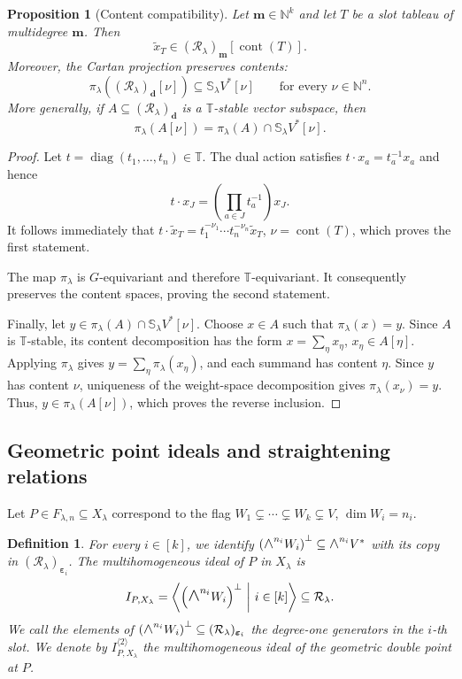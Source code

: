 \documentclass[a4paper,reqno]{amsart}
\theoremstyle{plainnopunct}
\newtheorem{proposition}[proposition]{Proposition}
\theoremstyle{definitionnopunct}
\newtheorem{definition}[definition]{Definition}
\newcommand{\superwedge}{\mathlarger{\mathlarger{\wedge}}}
\newcommand{\N}{\mathbb{N}}
\renewcommand{\S}{\mathbb{S}}
\newcommand{\cR}{\mathcal{R}}
\newcommand{\bd}{\mathbf{d}}
\newcommand{\bepsilon}{\boldsymbol{\varepsilon}}
\DeclareMathOperator{\cont}{cont}
\begin{document}
\begin{proposition}[Content compatibility]
\label{prop: slot content compatibility}
Let $\mathbf m\in\N^k
$ and let $T$ be a slot tableau of multidegree $\mathbf m$. Then
\[
\widetilde{x}_T
\in
(\cR_\lambda)_{\mathbf m}[\cont(T)].
\]
Moreover, the Cartan projection preserves contents:
\[
\pi_\lambda
\left(
(\cR_\lambda)_{\bd}[\nu]
\right)
\subseteq
\S_\lambda V^*[\nu]
\qquad
\text{for every }\nu\in\N^n.
\]
More generally, if $A\subseteq
(\cR_\lambda)_{\bd}$
is a $\mathbb T$-stable vector subspace, then
\[
\pi_\lambda
\left(
A[\nu]
\right)
=
\pi_\lambda(A)
\cap
\S_\lambda V^*[\nu].
\]
\end{proposition}

\begin{proof}
Let $t=\operatorname{diag}(t_1,\ldots,t_n)
\in\mathbb T$.
The dual action satisfies $t\cdot x_a=t_a^{-1}x_a$
and hence
\[
t\cdot x_J
=
\left(
\prod_{a\in J}t_a^{-1}
\right)x_J.
\]
It follows immediately that
$t\cdot\widetilde{x}_T
=
t_1^{-\nu_1}\cdots t_n^{-\nu_n}
\widetilde{x}_T$, $\nu=\cont(T)$,
which proves the first statement.

The map $\pi_\lambda$ is $G$-equivariant and therefore
$\mathbb T$-equivariant. It consequently preserves the content
spaces, proving the second statement.

Finally, let
$y
\in
\pi_\lambda(A)
\cap
\S_\lambda V^*[\nu]$.
Choose $x\in A$ such that
$\pi_\lambda(x)=y$.
Since $A$ is $\mathbb T$-stable, its content decomposition has the
form
$x=\sum_\eta x_\eta$,
$x_\eta\in A[\eta]$.
Applying $\pi_\lambda$ gives
$y
=
\sum_\eta
\pi_\lambda(x_\eta)$,
and each summand has content $\eta$. Since $y$ has content $\nu$,
uniqueness of the weight-space decomposition gives
$\pi_\lambda(x_\nu)=y$. 
Thus, $y\in\pi_\lambda(A[\nu])$,
which proves the reverse inclusion.
\end{proof}

\subsection{Geometric point ideals and straightening relations}
\label{subsect: point ideals and straightening}

Let $P\in F_{\lambda,n}\subseteq X_\lambda$ correspond to the flag
$W_1\subsetneq\cdots\subsetneq W_k\subsetneq V$, $\dim W_i=n_i$.

\begin{definition}
\label{def: point ideal in slot algebra}
For every $i\in[k]$, we identify $
\left(
\superwedge^{n_i}W_i
\right)^\perp
\subseteq
\superwedge^{n_i}V^*$
with its copy in
$(\cR_\lambda)_{\bepsilon_i}$. The multihomogeneous ideal of $P$ in $X_\lambda$ is
\[
I_{P,X_\lambda}
=
\left\langle
\left(
\superwedge^{n_i}W_i
\right)^\perp
\ \middle|\
i\in[k]
\right\rangle
\subseteq
\cR_\lambda.
\]
We call the elements of $
\left(
\superwedge^{n_i}W_i
\right)^\perp
\subseteq
(\cR_\lambda)_{\bepsilon_i}$
the \emph{degree-one generators in the $i$-th slot}. We denote by $I_{P,X_\lambda}^{\langle2\rangle}$
the multihomogeneous ideal of the geometric double point at
$P$.
\end{definition}
\end{document}
